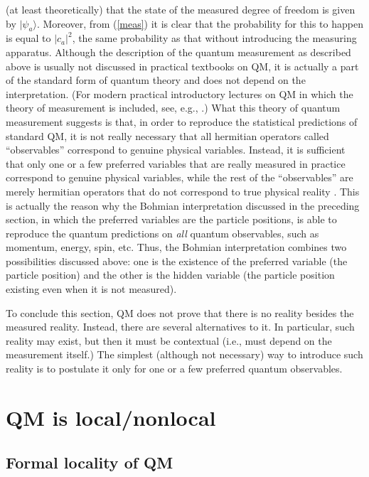 \documentclass[12pt]{article}
\begin{document}
(at least theoretically) that the state 
of the measured degree of freedom is given by $|\psi_a\rangle$. 
Moreover, from (\ref{meas}) it is clear that the probability for 
this to happen is equal to $|c_a|^2$, the same probability   
as that without introducing the measuring apparatus.
Although the description of the quantum measurement as described 
above is usually not discussed in practical textbooks on QM, 
it is actually a part of the standard form of quantum theory
and does not depend on the interpretation. (For modern practical 
introductory lectures on QM in which the theory of measurement
is included, see, e.g., \cite{lectqm}.)  
What this theory of quantum measurement suggests is that, 
in order to reproduce the statistical predictions of standard QM, it is not 
really necessary that all hermitian operators called ``observables'' 
correspond to genuine physical variables. Instead, it is 
sufficient that only one or a few preferred variables that are really 
measured in practice correspond to genuine physical variables, 
while the rest of the ``observables'' are merely 
hermitian operators that do not correspond to true 
physical reality \cite{naive}. This is actually the reason 
why the Bohmian interpretation discussed in the preceding section,
in which the preferred variables are the particle positions, is able 
to reproduce the quantum predictions on {\em all} 
quantum observables, such as momentum, energy, spin, etc.
Thus, the Bohmian interpretation combines two possibilities discussed 
above: one is the existence of the preferred variable (the particle position) 
and the other is the hidden variable (the particle position existing even 
when it is not measured).

To conclude this section, QM does not prove that there is no 
reality besides the measured reality. Instead, there are several 
alternatives to it. In particular, such reality may exist, 
but then it must be contextual (i.e., must depend 
on the measurement itself.) The simplest (although not necessary) 
way to introduce such reality is to postulate it only for one 
or a few preferred quantum observables.    
  
\section{QM is local/nonlocal}
\label{L/NL}

\subsection{Formal locality of QM}
\end{document}
